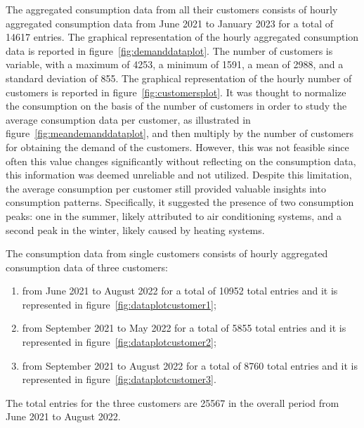 The aggregated consumption data from all their customers consists of hourly aggregated consumption data from June 2021 to January 2023 for a total of 14617 entries.
The graphical representation of the hourly aggregated consumption data is reported in figure~\ref{fig:demanddataplot}.
The number of customers is variable, with a maximum of 4253, a minimum of 1591, a mean of 2988, and a standard deviation of 855.
The graphical representation of the hourly number of customers is reported in figure~\ref{fig:customersplot}.
It was thought to normalize the consumption on the basis of the number of customers in order to study the average consumption data per customer, as illustrated in figure~\ref{fig:meandemanddataplot}, and then multiply by the number of customers for obtaining the demand of the customers.
However, this was not feasible since often this value changes significantly without reflecting on the consumption data, this information was deemed unreliable and not utilized.
Despite this limitation, the average consumption per customer still provided valuable insights into consumption patterns.
Specifically, it suggested the presence of two consumption peaks: one in the summer, likely attributed to air conditioning systems, and a second peak in the winter, likely caused by heating systems.

The consumption data from single customers consists of hourly aggregated consumption data of three customers:
\begin{enumerate}
  \item from June 2021 to August 2022 for a total of 10952 total entries and it is represented in figure~\ref{fig:dataplotcustomer1};
  \item from September 2021 to May 2022 for a total of 5855 total entries and it is represented in figure~\ref{fig:dataplotcustomer2};
  \item from September 2021 to August 2022 for a total of 8760 total entries and it is represented in figure~\ref{fig:dataplotcustomer3}.
\end{enumerate}
The total entries for the three customers are 25567 in the overall period from June 2021 to August 2022.

